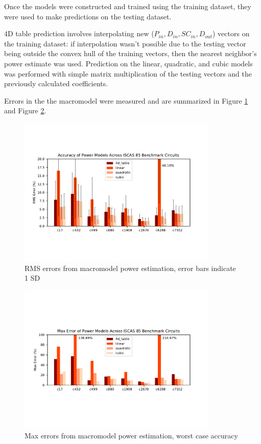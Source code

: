 Once the models were constructed and trained using the training dataset, they were used to make predictions on the testing dataset.

4D table prediction involves interpolating new ($P_{in}, D_{in}, SC_{in}, D_{out}$) vectors on the training dataset: if interpolation wasn't possible due to the testing vector being outside the convex hull of the training vectors, then the nearest neighbor's power estimate was used. Prediction on the linear, quadratic, and cubic models was performed with simple matrix multiplication of the testing vectors and the previously calculated coefficients.

Errors in the the macromodel were measured and are summarized in Figure \ref{fig:rms_error} and Figure \ref{fig:max_error}.

\begin{figure}
	\centering
	\includegraphics[clip, trim=0.5cm 2.5cm 0.5cm 2.5cm,width=0.85\textwidth,height=\textheight,keepaspectratio]{images/error_plot.pdf}
	\caption{RMS errors from macromodel power estimation, error bars indicate 1 SD}
	\label{fig:rms_error}
\end{figure}

\begin{figure}
	\centering
	\includegraphics[clip, trim=0.5cm 3cm 0.5cm 3cm,width=0.85\textwidth,height=\textheight,keepaspectratio]{images/max_error_plot.pdf}
	\caption{Max errors from macromodel power estimation, worst case accuracy}
	\label{fig:max_error}
\end{figure}


